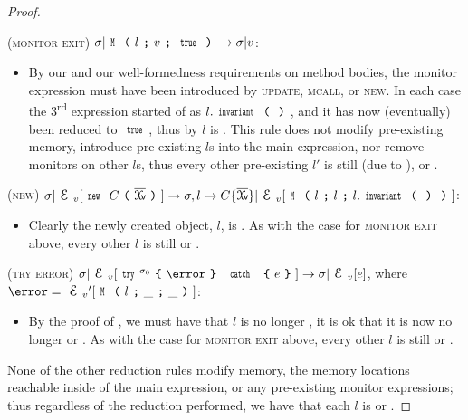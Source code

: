 \begin{proof}
\begin{ienumerate}
	\item (\textsc{monitor exit}) $\s|\M{l}{v}{\Kw{true}}\rightarrow \s|v$:
	\begin{itemize}
	\item[] By our \VS and our well-formedness requirements on method bodies, the monitor expression must have been introduced by \textsc{update}, \textsc{mcall}, or \textsc{new}. In each case the 3\textsuperscript{rd} expression started of as $l.\invariant$, and it has now (eventually) been reduced to $\Kw{true}$, thus by  $l$ is \valid. This rule does not modify pre-existing memory, introduce pre-existing $l$s into the main expression, nor remove monitors on other $l$s, thus every other pre-existing $l'$ is still \valid (due to ), or \mony.
	\end{itemize}

		\item (\textsc{new}) $\s|\EV[\Kw{new}\ C\oR\vs\cR]\rightarrow \s,l\mapsto C\{\vs\}|\EV[ \M{l}{l}{l.\invariant}]$:
		\begin{itemize}
			\item[] Clearly the newly created object, $l$, is \mony. As with the case for \textsc{monitor exit} above, every other \reach $l$ is still \valid or \mony.
		\end{itemize}
			
		\item (\textsc{try error}) $\s|\EV[\Kw{try}^{\s_0}\oC \error\cC\ \Kw{catch}\ \oC e\cC] \rightarrow \s|\EV[e]$, where $\error = \EV'[\M{l}{\_}{\_}]$:
		\begin{itemize}
			\item[] By the proof of , we must have that $l$ is no longer \reach, it is ok that it is now no longer \valid or \mony. As with the case for \textsc{monitor exit} above, every other \reach $l$ is still \valid or \mony.
		\end{itemize}
\end{ienumerate}

\noindent None of the other reduction rules modify memory, the memory locations reachable inside of the main expression, or any pre-existing monitor expressions; thus regardless of the reduction performed, we have that each \reach $l$ is \valid or \mony.
\end{proof}

